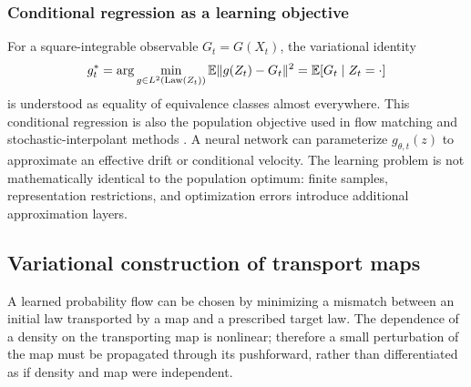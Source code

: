 \documentclass[12pt,a4paper,oneside]{book}
\begin{document}
\subsubsection{Conditional regression as a learning objective}
For a square-integrable observable $G_t=G(X_t)$, the variational identity
\begin{equation*}
g_t^*=\arg\min_{g\in L^2(\operatorname{Law}(Z_t))}
 \mathbb{E}\|g(Z_t)-G_t\|^2
 =\mathbb{E}[G_t\mid Z_t=\cdot]
\end{equation*}
is understood as equality of equivalence classes almost everywhere.
This conditional regression is also the population objective used in flow matching and stochastic-interpolant methods \cite{lipman2023,albergo2025}. A neural network can parameterize $g_{\theta,t}(z)$ to approximate an
effective drift or conditional velocity. The learning problem is not
mathematically identical to the population optimum: finite samples,
representation restrictions, and optimization errors introduce additional
approximation layers.


\subsection{Variational construction of transport maps}
A learned probability flow can be chosen by minimizing a mismatch
between an initial law transported by a map and a prescribed target
law. The dependence of a density on the transporting map is nonlinear;
therefore a small perturbation of the map must be propagated through
its pushforward, rather than differentiated as if density and map were
independent.
\end{document}
